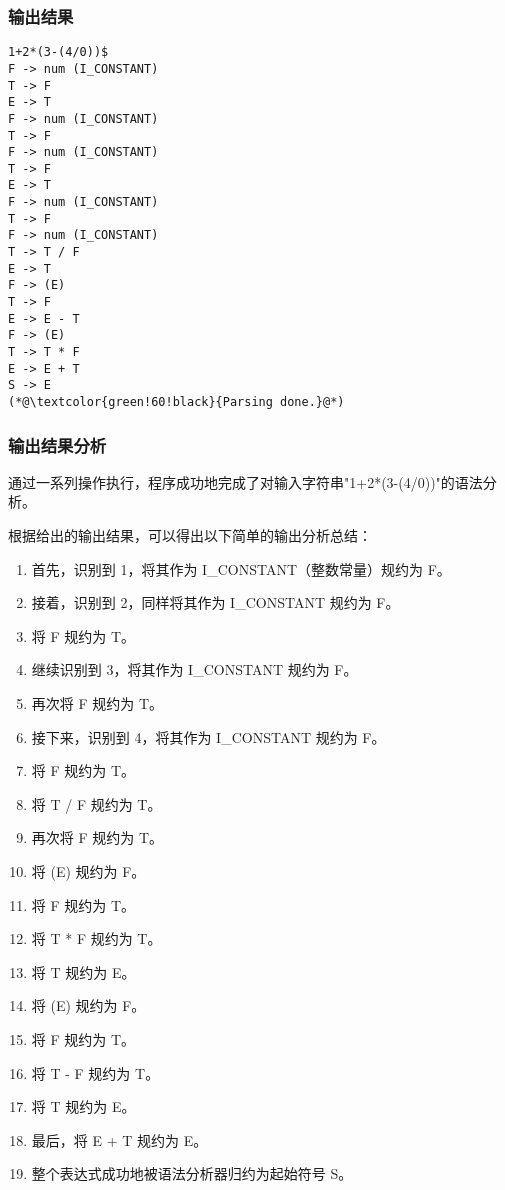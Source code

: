 \documentclass[lang=cn,11pt,a4paper]{elegantpaper}
\begin{document}
\subsubsection{输出结果}

\begin{lstlisting}[language=text]
1+2*(3-(4/0))$
F -> num (I_CONSTANT)
T -> F
E -> T
F -> num (I_CONSTANT)
T -> F
F -> num (I_CONSTANT)
T -> F
E -> T
F -> num (I_CONSTANT)
T -> F
F -> num (I_CONSTANT)
T -> T / F
E -> T
F -> (E)
T -> F
E -> E - T
F -> (E)
T -> T * F
E -> E + T
S -> E
(*@\textcolor{green!60!black}{Parsing done.}@*)
\end{lstlisting}

\subsubsection{输出结果分析}

通过一系列操作执行，程序成功地完成了对输入字符串"1+2*(3-(4/0))"的语法分析。

根据给出的输出结果，可以得出以下简单的输出分析总结：
\begin{enumerate}
    \item 首先，识别到 1，将其作为 I\_CONSTANT（整数常量）规约为 F。
    \item 接着，识别到 2，同样将其作为 I\_CONSTANT 规约为 F。
    \item 将 F 规约为 T。
    \item 继续识别到 3，将其作为 I\_CONSTANT 规约为 F。
    \item 再次将 F 规约为 T。
    \item 接下来，识别到 4，将其作为 I\_CONSTANT 规约为 F。
    \item 将 F 规约为 T。
    \item 将 T / F 规约为 T。
    \item 再次将 F 规约为 T。
    \item 将 (E) 规约为 F。
    \item 将 F 规约为 T。
    \item 将 T * F 规约为 T。
    \item 将 T 规约为 E。
    \item 将 (E) 规约为 F。
    \item 将 F 规约为 T。
    \item 将 T - F 规约为 T。
    \item 将 T 规约为 E。
    \item 最后，将 E + T 规约为 E。
    \item 整个表达式成功地被语法分析器归约为起始符号 S。
\end{enumerate}
\end{document}
